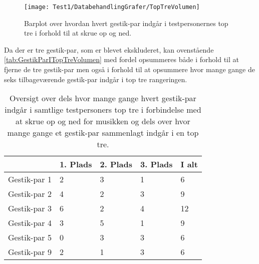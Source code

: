 %
\begin{figure}[H]
	\centering
	\texttt{[image: Test1/DatabehandlingGrafer/TopTreVolumen]}
	\caption{Barplot over hvordan hvert gestik-par indgår i testpersonernes top tre i forhold til at skrue op og ned.}
	\label{fig:SamletTopTreVolumen}
\end{figure}
\noindent
%
Da der er tre gestik-par, som er blevet ekskluderet, kan ovenstående  \autoref{tab:GestikParITopTreVolumen} med fordel opsummeres både i forhold til at fjerne de tre gestik-par men også i forhold til at opsummere hvor mange gange de seks tilbageværende gestik-par indgår i top tre rangeringen. 
%
\begin{table}[H]
	\centering
	\begin{tabular}{ | p{2.4cm} | p{2.4cm} | p{2.4cm} | p{2.4cm} |p{2.4cm}|}
		\hline
		& 1. Plads & 2. Plads & 3. Plads & I alt \\ \hline
		Gestik-par 1 & 2 & 3 & 1 & 6\\ \hline
		Gestik-par 2 & 4 & 2 & 3 & 9\\ \hline
		Gestik-par 3 & 6 & 2 & 4 & 12\\ \hline
		Gestik-par 4 & 3 & 5 & 1 & 9\\ \hline 
		Gestik-par 5 & 0 & 3 & 3 & 6\\ \hline
		Gestik-par 9 & 2 & 1 & 3 & 6\\ \hline
	\end{tabular}
	\caption{Oversigt over dels hvor mange gange hvert gestik-par indgår i samtlige testpersoners top tre i forbindelse med at skrue op og ned for musikken og dels over hvor mange gange et gestik-par sammenlagt indgår i en top tre.}
	\label{tab:GestikParITopTreVolumenOversigt}
\end{table}
\noindent
%
